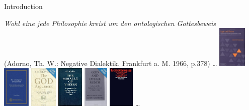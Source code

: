 \begin{frame}{Introduction}

\emph{\huge Wohl eine jede Philosophie kreist um den ontologischen
  Gottesbeweis} \\[2em]
(Adorno, Th. W.: Negative Dialektik. Frankfurt a. M. 1966, p.378)
\vfill
\ldots \hfill
\includegraphics[height=2cm]{buch3.jpg} \hfill
\includegraphics[height=2cm]{buch2.jpg} \hfill 
\includegraphics[height=2cm]{buch4.jpg} \hfill
\includegraphics[height=2cm]{buch5.jpg} \hfill
\includegraphics[height=2cm]{buch6.jpg} \hfill
\includegraphics[height=2cm]{buch1.jpg} \hfill
\ldots
\end{frame}


